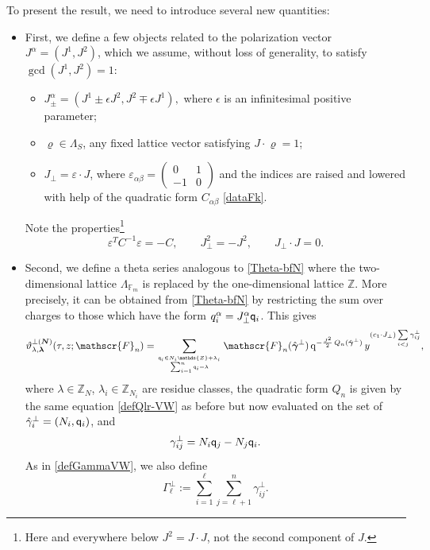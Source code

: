 \documentclass[12pt,letterpaper]{JHEP3}
\def\be{\begin{equation}}
\def\ee{\end{equation}}
\def\({\left(}
\def\){\right)}
\newcommand{\vth}{\vartheta}
\def\vrh{\varrho}
\newcommand{\eps}{\epsilon}
\newcommand{\veps}{\varepsilon}
\newcommand{\qsf}{{\sf q}}
\newcommand{\IZ}{\mathds{Z}}
\newcommand{\IF}{\mathds{F}}
\def\Fv{\mathscr{F}}
\newcommand{\bfN}{{\boldsymbol N}}
\newcommand{\bflam}{{\boldsymbol \lambda}}
\newcommand{\bfgam}{{\boldsymbol \gamma}}
\def\hgam{\hat\gamma}
\def\bfhgam{\hat\bfgam}
\def\vth{\vartheta}
\newcommand{\q}{\mathrm{q}}
\begin{document}
To present the result, we need to introduce several new quantities:

\begin{itemize}
\item 
First, we define a few objects related to the polarization vector $J^\alpha=(J^1,J^2)$,
which we assume, without loss of generality, to satisfy $\gcd(J^1,J^2)=1$:
\begin{itemize}
	\item 
	$ 
	J_\pm^\alpha=(J^1\pm \eps J^2, J^2\mp\eps J^1),
	\label{Jpm}
	$	
	where $\eps$ is an infinitesimal positive parameter;
	\item 
	$\vrh\in\Lambda_S$, any fixed lattice vector satisfying $J\cdot \vrh=1$;
	\item
	$J_\perp=\veps\cdot J$, where $\veps_{\alpha\beta}=\(\begin{array}{cc}0 & 1\\-1 & 0\end{array}\)$
	and the indices are raised and lowered with help of the	quadratic form $C_{\alpha\beta}$ \eqref{dataFk}.
\end{itemize}
Note the properties\footnote{Here and everywhere below $J^2=J\cdot J$, not the second component of $J$.}
\be 
\veps^T C^{-1} \veps=-C,
\qquad
J_\perp^2=-J^2,
\qquad
J_\perp\cdot J=0.
\label{prop-JJp}
\ee 
	
\item 
Second, we define a theta series analogous to \eqref{Theta-bfN} where the two-dimensional lattice $\Lambda_{\IF_m}$ is replaced by 
the one-dimensional lattice $\IZ$.
More precisely, it can be obtained from \eqref{Theta-bfN} by restricting the sum over charges
to those which have the form $q_i^\alpha=J_\perp^\alpha \qsf_i$. This gives
\be 
\vth^{\perp(\bfN)}_{\lambda,\bflam}(\tau,z;\Fv_n)=
\sum_{\qsf_i\in N_i\IZ+\lambda_i\atop \sum_{i=1}^n \qsf_i=\lambda}
\Fv_n(\bfhgam^\perp)\,
\q^{-\frac{J^2}{2}\,Q_n(\bfhgam^\perp)}\, y^{(c_1\cdot J_\perp)\sum\limits_{i<j}\gamma^\perp_{ij}},
\label{def-vthperp}
\ee 
where $\lambda\in\IZ_N$, $\lambda_i\in\IZ_{N_i}$ are residue classes, 
the quadratic form $Q_n$ is given by the same equation \eqref{defQlr-VW} as before but now evaluated on 
the set of $\hgam^\perp_i=(N_i,\qsf_i)$, and 
\be 
\gamma^\perp_{ij}=N_i \qsf_j -N_j \qsf_i.
\ee 
As in \eqref{defGammaVW}, we also define 
\be
\Gamma^\perp_\ell:=\sum_{i=1}^\ell\sum_{j=\ell+1}^n\gamma^\perp_{ij}.
\label{defGamma-perp}
\ee


\end{itemize}
\end{document}
